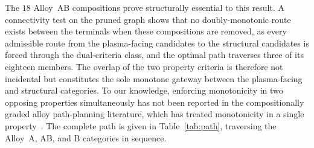 The \(18\) Alloy~AB compositions prove structurally essential to this result.
A connectivity test on the pruned graph shows that no doubly-monotonic
route exists between the terminals when these compositions are removed, as
every admissible route from the plasma-facing candidates to the structural
candidates is forced through the dual-criteria class, and the optimal path
traverses three of its eighteen members. The overlap of the two property criteria is
therefore not incidental but constitutes the sole monotone gateway between
the plasma-facing and structural categories. To our knowledge, enforcing monotonicity in two
opposing properties simultaneously has not been reported in the
compositionally graded alloy path-planning literature, which has treated
monotonicity in a single property~\cite{kirk2021monotonic}. The
complete path is given in Table~\ref{tab:path}, traversing the Alloy~A, AB,
and B categories in sequence.

